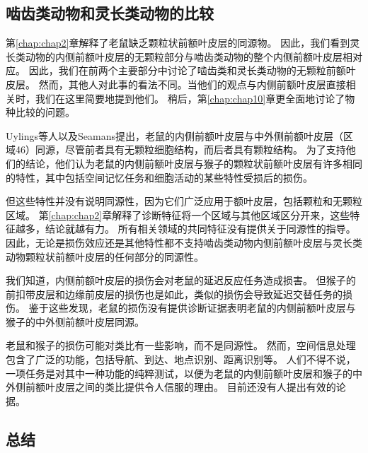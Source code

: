 \subsection{啮齿类动物和灵长类动物的比较}

第\ref{chap:chap2}章解释了老鼠缺乏颗粒状前额叶皮层的同源物。
因此，我们看到灵长类动物的内侧前额叶皮层的无颗粒部分与啮齿类动物的整个内侧前额叶皮层相对应。
因此，我们在前两个主要部分中讨论了啮齿类和灵长类动物的无颗粒前额叶皮层。
然而，其他人对此事的看法不同。当他们的观点与内侧前额叶皮层直接相关时，我们在这里简要地提到他们。
稍后，第\ref{chap:chap10}章更全面地讨论了物种比较的问题。\par


Uylings等人\cite{uylings2003rats}以及Seamans\cite{seamans2008comparing}提出，老鼠的内侧前额叶皮层与中外侧前额叶皮层（区域46）同源，尽管前者具有无颗粒细胞结构，而后者具有颗粒结构。
为了支持他们的结论，他们认为老鼠的内侧前额叶皮层与猴子的颗粒状前额叶皮层有许多相同的特性，其中包括空间记忆任务和细胞活动的某些特性受损后的损伤。\par


但这些特性并没有说明同源性，因为它们广泛应用于额叶皮层，包括颗粒和无颗粒区域。
第\ref{chap:chap2}章解释了诊断特征将一个区域与其他区域区分开来，这些特征越多，结论就越有力。
所有相关领域的共同特征没有提供关于同源性的指导。
因此，无论是损伤效应还是其他特性都不支持啮齿类动物内侧前额叶皮层与灵长类动物颗粒状前额叶皮层的任何部分的同源性。\par


我们知道，内侧前额叶皮层的损伤会对老鼠的延迟反应任务造成损害\cite{kolb1974double}。
但猴子的前扣带皮层和边缘前皮层的损伤也是如此\cite{meunier1997effects}，类似的损伤会导致延迟交替任务的损伤\cite{rushworth2003effect}。
鉴于这些发现，老鼠的损伤没有提供诊断证据表明老鼠的内侧前额叶皮层与猴子的中外侧前额叶皮层同源。\par


老鼠和猴子的损伤可能对类比有一些影响，而不是同源性\cite{brown2002rodent}。
然而，空间信息处理包含了广泛的功能，包括导航、到达、地点识别、距离识别等。
人们不得不说，一项任务是对其中一种功能的纯粹测试，以便为老鼠的内侧前额叶皮层和猴子的中外侧前额叶皮层之间的类比提供令人信服的理由。
目前还没有人提出有效的论据。\par



\subsection{总结}

